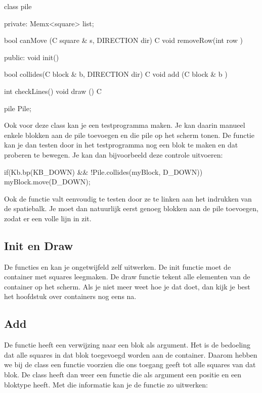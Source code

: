 \begin{code}
class pile
{
private:
   Memx<square> list;
   
   bool canMove  (C square & s,  DIRECTION dir) C {}   
   void removeRow(int row                     )   {}
   
public:
   void init() {}
   
   bool collides(C block & b, DIRECTION dir) C {}   
   void add     (C block & b               )   {}
   
   int checkLines()   {}   
   void draw     () C {}
}

pile Pile;
\end{code}

Ook voor deze class kan je een testprogramma maken. Je kan daarin manueel enkele blokken aan de pile toevoegen en die pile op het scherm tonen. De functie  kan je dan testen door in het testprogramma nog een blok te maken en dat proberen te bewegen. Je kan dan bijvoorbeeld deze controle uitvoeren:

\begin{code}
if(Kb.bp(KB_DOWN) && !Pile.collides(myBlock, D_DOWN)) {
  myBlock.move(D_DOWN);
}
\end{code}

Ook de  functie valt eenvoudig te testen door ze te linken aan het indrukken van de spatiebalk. Je moet dan natuurlijk eerst genoeg blokken aan de pile toevoegen, zodat er een volle lijn in zit.

\subsection{Init en Draw}
De functies  en  kan je ongetwijfeld zelf uitwerken. De init functie moet de container met squares leegmaken. De draw functie tekent alle elementen van de container op het scherm. Als je niet meer weet hoe je dat doet, dan kijk je best het hoofdstuk over containers nog eens na.

\subsection{Add}
De functie  heeft een verwijzing naar een blok als argument. Het is de bedoeling dat alle squares in dat blok toegevoegd worden aan de container. Daarom hebben we bij de class  een functie voorzien die ons toegang geeft tot alle squares van dat blok. De class  heeft dan weer een functie  die als argument een positie en een bloktype heeft. Met die informatie kan je de functie zo uitwerken:

